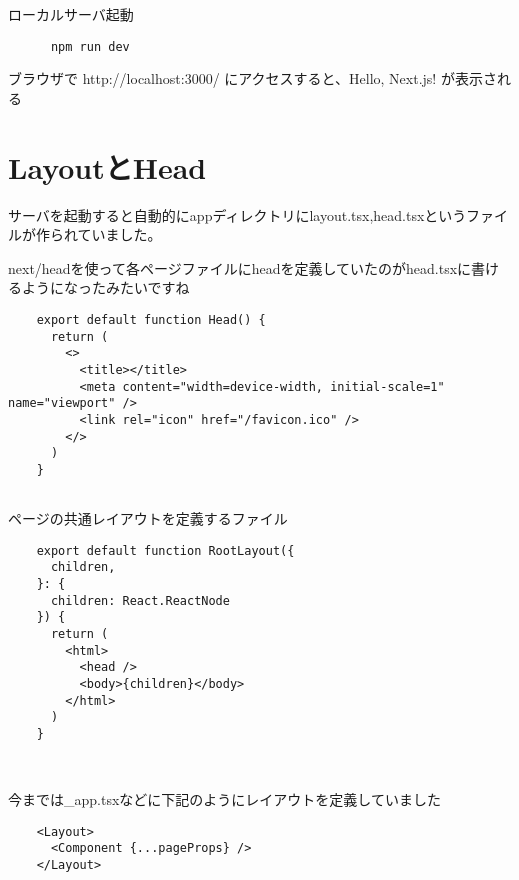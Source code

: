ローカルサーバ起動

\begin{tcolorbox}[breakable]
  \begin{verbatim}
      npm run dev

    \end{verbatim}
\end{tcolorbox}



ブラウザで http://localhost:3000/ にアクセスすると、Hello, Next.js! が表示される




\section{LayoutとHead
 }

サーバを起動すると自動的にappディレクトリにlayout.tsx,head.tsxというファイルが作られていました。

next/headを使って各ページファイルにheadを定義していたのがhead.tsxに書けるようになったみたいですね

\begin{tcolorbox}[breakable]
  \begin{verbatim}
    export default function Head() {
      return (
        <>
          <title></title>
          <meta content="width=device-width, initial-scale=1" name="viewport" />
          <link rel="icon" href="/favicon.ico" />
        </>
      )
    }
    
      \end{verbatim}
\end{tcolorbox}



ページの共通レイアウトを定義するファイル


\begin{tcolorbox}[breakable]
  \begin{verbatim}
    export default function RootLayout({
      children,
    }: {
      children: React.ReactNode
    }) {
      return (
        <html>
          <head />
          <body>{children}</body>
        </html>
      )
    }
    
      
        \end{verbatim}
\end{tcolorbox}


今までは\_app.tsxなどに下記のようにレイアウトを定義していました
\begin{tcolorbox}[breakable]
  \begin{verbatim}
    <Layout>
      <Component {...pageProps} />
    </Layout>
  \end{verbatim}
\end{tcolorbox}





